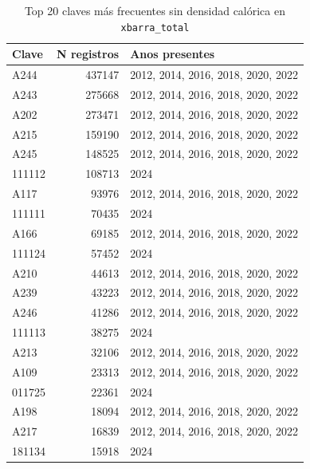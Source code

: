 \begin{table}[ht]
\centering
\caption{Top 20 claves m\'as frecuentes sin densidad cal\'orica en \texttt{xbarra\_total}} 
\label{tab:03b_top20_claves_sin_match}
\begin{tabular}{lrl}
  \toprule
Clave & N registros & Anos presentes \\ 
  \midrule
A244 & 437147 & 2012, 2014, 2016, 2018, 2020, 2022 \\ 
  A243 & 275668 & 2012, 2014, 2016, 2018, 2020, 2022 \\ 
  A202 & 273471 & 2012, 2014, 2016, 2018, 2020, 2022 \\ 
  A215 & 159190 & 2012, 2014, 2016, 2018, 2020, 2022 \\ 
  A245 & 148525 & 2012, 2014, 2016, 2018, 2020, 2022 \\ 
  111112 & 108713 & 2024 \\ 
  A117 & 93976 & 2012, 2014, 2016, 2018, 2020, 2022 \\ 
  111111 & 70435 & 2024 \\ 
  A166 & 69185 & 2012, 2014, 2016, 2018, 2020, 2022 \\ 
  111124 & 57452 & 2024 \\ 
  A210 & 44613 & 2012, 2014, 2016, 2018, 2020, 2022 \\ 
  A239 & 43223 & 2012, 2014, 2016, 2018, 2020, 2022 \\ 
  A246 & 41286 & 2012, 2014, 2016, 2018, 2020, 2022 \\ 
  111113 & 38275 & 2024 \\ 
  A213 & 32106 & 2012, 2014, 2016, 2018, 2020, 2022 \\ 
  A109 & 23313 & 2012, 2014, 2016, 2018, 2020, 2022 \\ 
  011725 & 22361 & 2024 \\ 
  A198 & 18094 & 2012, 2014, 2016, 2018, 2020, 2022 \\ 
  A217 & 16839 & 2012, 2014, 2016, 2018, 2020, 2022 \\ 
  181134 & 15918 & 2024 \\ 
   \bottomrule
\end{tabular}
\end{table}
